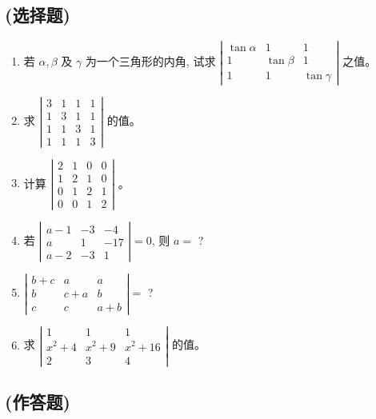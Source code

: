 \documentclass{report}
\begin{document}
\subsection*{(选择题)}
\begin{enumerate}
  \item 若 $\alpha, \beta$ 及 $\gamma$ 为一个三角形的内角, 试求 $\left|\begin{array}{ccc}\tan \alpha & 1 & 1 \\ 1 & \tan \beta & 1 \\ 1 & 1 & \tan \gamma\end{array}\right|$ 之值。
  \item 求 $\left|\begin{array}{llll}3 & 1 & 1 & 1 \\ 1 & 3 & 1 & 1 \\ 1 & 1 & 3 & 1 \\ 1 & 1 & 1 & 3\end{array}\right|$ 的值。
  \item 计算 $\left|\begin{array}{llll}2 & 1 & 0 & 0 \\ 1 & 2 & 1 & 0 \\ 0 & 1 & 2 & 1 \\ 0 & 0 & 1 & 2\end{array}\right|$ 。
  \item 若 $\left|\begin{array}{ccc}a-1 & -3 & -4 \\ a & 1 & -17 \\ a-2 & -3 & 1\end{array}\right|=0$, 则 $a=$ ?
  \item $\left|\begin{array}{ccc}b+c & a & a \\ b & c+a & b \\ c & c & a+b\end{array}\right|=$ ?
  \item 求 $\left|\begin{array}{ccc}1 & 1 & 1 \\ x^{2}+4 & x^{2}+9 & x^{2}+16 \\ 2 & 3 & 4\end{array}\right|$ 的值。
\end{enumerate}

\subsection*{(作答题)}
\end{document}
